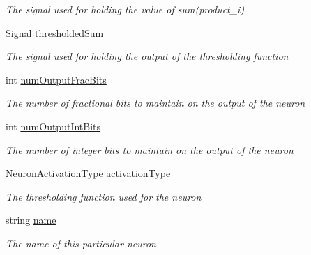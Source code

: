 \begin{DoxyCompactItemize}
\begin{DoxyCompactList}\small\item\em The signal used for holding the value of sum(product\+\_\+i) \end{DoxyCompactList}\item 
\hyperlink{class_n_n_gen_1_1_signal}{Signal} \hyperlink{class_n_n_gen_1_1_async_neuron_a1e0f902ec842b3b970e18c4d02401c4e}{thresholded\+Sum}
\begin{DoxyCompactList}\small\item\em The signal used for holding the output of the thresholding function \end{DoxyCompactList}\item 
int \hyperlink{class_n_n_gen_1_1_async_neuron_a3b0880328253a0c90da2d8ed655941bd}{num\+Output\+Frac\+Bits}
\begin{DoxyCompactList}\small\item\em The number of fractional bits to maintain on the output of the neuron \end{DoxyCompactList}\item 
int \hyperlink{class_n_n_gen_1_1_async_neuron_a0a5f5459d5bfe73ec3c6e1fd584ea126}{num\+Output\+Int\+Bits}
\begin{DoxyCompactList}\small\item\em The number of integer bits to maintain on the output of the neuron \end{DoxyCompactList}\item 
\hyperlink{class_n_n_gen_1_1_async_neuron_afe8460a52808d1587cbcc0a8e4e23b64}{Neuron\+Activation\+Type} \hyperlink{class_n_n_gen_1_1_async_neuron_aafa1d92f75c77c36546567c214840818}{activation\+Type}
\begin{DoxyCompactList}\small\item\em The thresholding function used for the neuron \end{DoxyCompactList}\item 
string \hyperlink{class_n_n_gen_1_1_async_neuron_a1b216c193a13ad763fee071d3238aab1}{name}
\begin{DoxyCompactList}\small\item\em The name of this particular neuron \end{DoxyCompactList}\end{DoxyCompactItemize}



